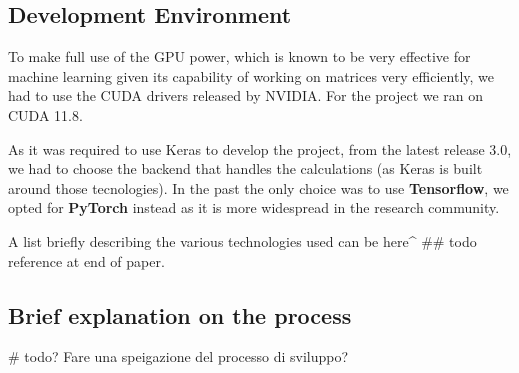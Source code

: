 \subsection{Development Environment}
To make full use of the GPU power, which is known to be very effective for machine learning given its
capability of working on matrices very efficiently, we had to use the CUDA drivers released by NVIDIA.
For the project we ran on CUDA 11.8.

As it was required to use Keras to develop the project, from the latest release 3.0, we had to choose
the backend that handles the calculations (as Keras is built around those tecnologies).
In the past the only choice was to use \textbf{Tensorflow}, we opted for \textbf{PyTorch} instead as it
is more widespread in the research community.

A list briefly describing the various technologies used can be here^ ## todo reference at end of paper.


\subsection{Brief explanation on the process}
# todo? Fare una speigazione del processo di sviluppo?